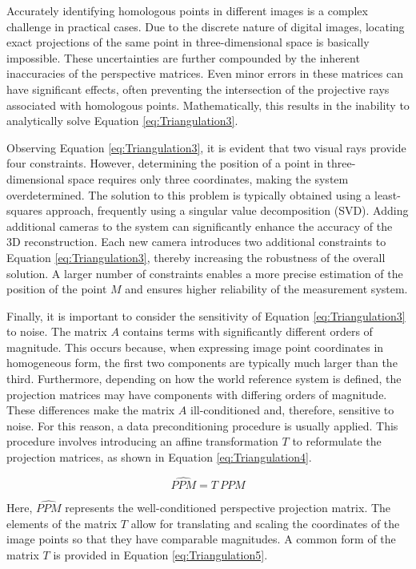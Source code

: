 Accurately identifying homologous points in different images is a complex challenge in practical cases. Due to the discrete nature of digital images, locating exact projections of the same point in three-dimensional space is basically impossible.
These uncertainties are further compounded by the inherent inaccuracies of the perspective matrices. Even minor errors in these matrices can have significant effects, often preventing the intersection of the projective rays associated with homologous points. Mathematically, this results in the inability to analytically solve Equation \ref{eq:Triangulation3}.

Observing Equation \ref{eq:Triangulation3}, it is evident that two visual rays provide four constraints. However, determining the position of a point in three-dimensional space requires only three coordinates, making the system overdetermined. The solution to this problem is typically obtained using a least-squares approach, frequently using a singular value decomposition (SVD).
Adding additional cameras to the system can significantly enhance the accuracy of the 3D reconstruction. Each new camera introduces two additional constraints to Equation \ref{eq:Triangulation3}, thereby increasing the robustness of the overall solution. A larger number of constraints enables a more precise estimation of the position of the point $M$ and ensures higher reliability of the measurement system.

Finally, it is important to consider the sensitivity of Equation \ref{eq:Triangulation3} to noise. The matrix $A$ contains terms with significantly different orders of magnitude. This occurs because, when expressing image point coordinates in homogeneous form, the first two components are typically much larger than the third. Furthermore, depending on how the world reference system is defined, the projection matrices may have components with differing orders of magnitude. 
These differences make the matrix $A$ ill-conditioned and, therefore, sensitive to noise. For this reason, a data preconditioning procedure is usually applied. This procedure involves introducing an affine transformation $T$ to reformulate the projection matrices, as shown in Equation \ref{eq:Triangulation4}.

\begin{equation}
  \hat{PPM} = T \ PPM
  \label{eq:Triangulation4}
\end{equation}

Here, $\hat{PPM}$ represents the well-conditioned perspective projection matrix.  
The elements of the matrix $T$ allow for translating and scaling the coordinates of the image points so that they have comparable magnitudes.  
A common form of the matrix $T$ is provided in Equation \ref{eq:Triangulation5}.

